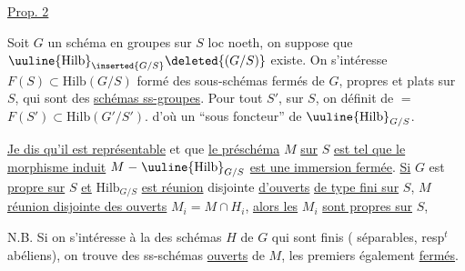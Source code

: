 \uline{Prop. 2}

Soit $G$ un schéma en groupes sur $S$ loc noeth,
on suppose que $\text{\uuline{Hilb}}_{\inserted{G/S}}\deleted{(G/S)}$ existe. On s'intéresse
 $F(S)\subset\mathrm{Hilb}(G/S)$ formé des
sous-schémas fermés de $G$, propres et plats sur $S$,
qui sont des \uline{schémas  ss-groupes}. Pour tout
$S'$, sur $S$, on définit de $=$ $F(S')\subset\mathrm{Hilb}(G'/S')$.
d'où un ``sous foncteur'' de $\text{\uuline{Hilb}}_{G/S}$.

\uline{Je dis qu'il est représentable} et que
\uline{le préschéma} $M$ \uline{sur} $S$ \uline{est tel que le
morphisme induit} $M\mathrel{-}\text{\uuline{Hilb}}_{G/S}$ \uline{est
une immersion fermée}. \uline{Si} $G$ est
\uline{propre sur} $S$ \uline{et} $\mathrm{Hilb}_{G/S}$ \uline{est réunion} disjointe
\uline{d'ouverts}  \uline{de type fini  sur} $S$,
  $M$ 
\uline{réunion disjointe des ouverts} $M_i=M\cap H_i$,
\uline{alors les} $M_i$ \uline{sont propres sur} $S$,

N.B. Si on s'intéresse à la  des  schémas  $H$
de $G$ qui sont  finis ( séparables, resp$^t$ abéliens),
on trouve des ss-schémas \uline{ouverts} de $M$, les premiers
 également \uline{fermés}.

